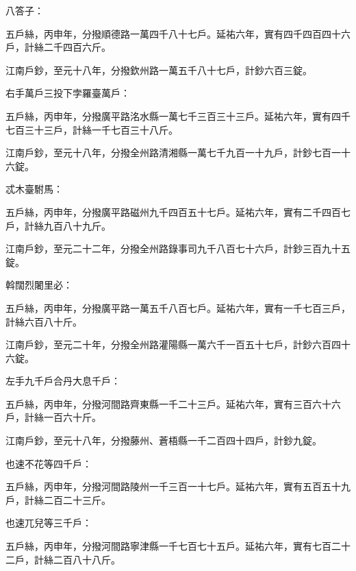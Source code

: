 \begin{pinyinscope}
 八答子：



 五戶絲，丙申年，分撥順德路一萬四千八十七戶。延祐六年，實有四千四百四十六戶，計絲二千四百六斤。



 江南戶鈔，至元十八年，分撥欽州路一萬五千八十七戶，計鈔六百三錠。



 右手萬戶三投下孛羅臺萬戶：



 五戶絲，丙申年，分撥廣平路洺水縣一萬七千三百三十三戶。延祐六年，實有四千七百三十三戶，計絲一千七百三十八斤。



 江南戶鈔，至元十八年，分撥全州路清湘縣一萬七千九百一十九戶，計鈔七百一十六錠。



 忒木臺駙馬：



 五戶絲，丙申年，分撥廣平路磁州九千四百五十七戶。延祐六年，實有二千四百七戶，計絲九百八十九斤。



 江南戶鈔，至元二十二年，分撥全州路錄事司九千八百七十六戶，計鈔三百九十五錠。



 斡闊烈闍里必：



 五戶絲，丙申年，分撥廣平路一萬五千八百七戶。延祐六年，實有一千七百三戶，計絲六百八十斤。



 江南戶鈔，至元二十年，分撥全州路灌陽縣一萬六千一百五十七戶，計鈔六百四十六錠。



 左手九千戶合丹大息千戶：



 五戶絲，丙申年，分撥河間路齊東縣一千二十三戶。延祐六年，實有三百六十六戶，計絲一百六十斤。



 江南戶鈔，至元十八年，分撥藤州、蒼梧縣一千二百四十四戶，計鈔九錠。



 也速不花等四千戶：



 五戶絲，丙申年，分撥河間路陵州一千三百一十七戶。延祐六年，實有五百五十九戶，計絲二百二十三斤。



 也速兀兒等三千戶：



 五戶絲，丙申年，分撥河間路寧津縣一千七百七十五戶。延祐六年，實有七百二十二戶，計絲二百八十八斤。




\end{pinyinscope}
